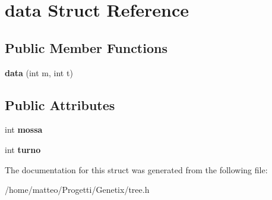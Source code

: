\hypertarget{structdata}{}\section{data Struct Reference}
\label{structdata}
\subsection*{Public Member Functions}
\begin{DoxyCompactItemize}
\item 
\mbox{\label{structdata_ad5a9caebaaee08e701c848b9722e5bf5}} 
{\bfseries data} (int m, int t)
\end{DoxyCompactItemize}
\subsection*{Public Attributes}
\begin{DoxyCompactItemize}
\item 
\mbox{\label{structdata_aa5c1b3aa3b43846e47b1ee08d1d19d3c}} 
int {\bfseries mossa}
\item 
\mbox{\label{structdata_a893101f17a0ccbc3a40f3661bf95d19e}} 
int {\bfseries turno}
\end{DoxyCompactItemize}


The documentation for this struct was generated from the following file\+:\begin{DoxyCompactItemize}
\item 
/home/matteo/\+Progetti/\+Genetix/tree.\+h\end{DoxyCompactItemize}
